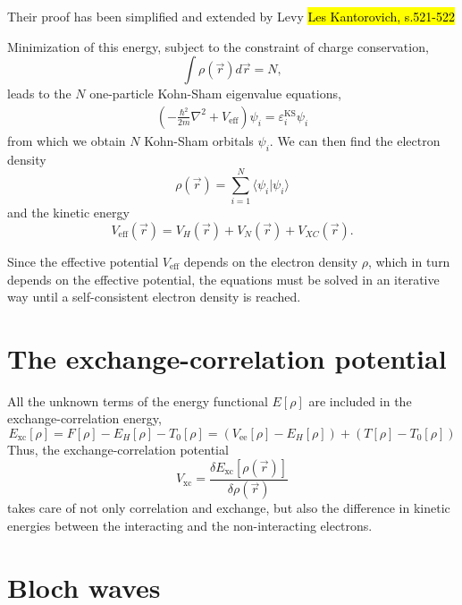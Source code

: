 \documentclass[11pt,bibliography=totoc,index=totoc]{scrbook}   %
\newcommand{\comment}[1]{\hl{#1}}
\begin{document}
Their proof has been simplified and extended by Levy 
\comment{Les Kantorovich, s.521-522}

Minimization of this energy, subject to the constraint
of charge conservation,
\begin{equation}
  \int \rho(\vec{r})d\vec{r} = N,
\end{equation}
leads to the $N$ one-particle Kohn-Sham eigenvalue equations,
\begin{align}
  \left(-\frac{\hbar^2}{2m}\nabla^2 + V_{\text{eff}}\right) \psi_i =
  \varepsilon_i^\text{KS} \psi_i
\end{align}
from which we obtain $N$ Kohn-Sham orbitals $\psi_i$. We can then 
find the electron density
\begin{equation}
  \rho(\vec{r}) = \sum_{i=1}^N \langle \psi_i|\psi_i\rangle
\end{equation}
and the kinetic energy
\begin{equation}
  V_{\text{eff}}(\vec{r}) = V_H(\vec{r}) + V_N(\vec{r}) + V_{XC}(\vec{r}).
  \label{eq:eff-pot}
\end{equation}

Since the effective potential $V_{\text{eff}}$ depends on the electron 
density $\rho$, which in turn depends on the effective potential, the equations
must be solved in an iterative way until a self-consistent electron density is 
reached.

\section{The exchange-correlation potential}

All the unknown terms of the energy functional $E[\rho]$ are included in the exchange-correlation energy, 
\begin{equation}
  E_{\mathrm{xc}}[\rho] = F[\rho] - E_H[\rho] - T_0[\rho] = (V_{\text{ee}}[\rho] - E_H[\rho]) + (T[\rho] - T_0[\rho])
\end{equation}
Thus, the exchange-correlation potential
\begin{equation}
  V_{\mathrm{xc}} = \frac{\delta E_{\mathrm{xc}}[\rho(\vec{r})]}{\delta\rho(\vec{r})}
\end{equation}
takes care of not only correlation and exchange, but also the difference in kinetic energies between the interacting and the non-interacting electrons.



\section{Bloch waves}
\end{document}
